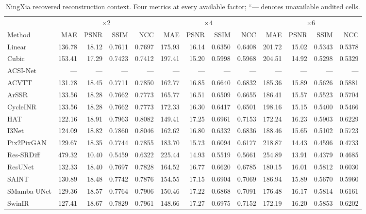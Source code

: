 \begin{table}[t]
\caption{NingXia recovered reconstruction context. Four metrics at every available factor; ``--- denotes unavailable audited cells.}
\label{tab:arch-benchmark-ningxia}\centering\scriptsize
\setlength{\tabcolsep}{3pt}
\begin{tabular}{lrrrrrrrrrrrr}
\toprule
&\multicolumn{4}{c}{$\times2$}&\multicolumn{4}{c}{$\times4$}&\multicolumn{4}{c}{$\times6$}\\
Method&MAE&PSNR&SSIM&NCC&MAE&PSNR&SSIM&NCC&MAE&PSNR&SSIM&NCC\\
\midrule
Linear & 136.78 & 18.12 & 0.7611 & 0.7697 & 175.93 & 16.14 & 0.6350 & 0.6408 & 201.72 & 15.02 & 0.5343 & 0.5378 \\
Cubic & 153.41 & 17.29 & 0.7423 & 0.7412 & 197.41 & 15.20 & 0.5998 & 0.5968 & 204.51 & 14.92 & 0.5298 & 0.5329 \\
ACSI-Net & --- & --- & --- & --- & --- & --- & --- & --- & --- & --- & --- & --- \\
ACVTT & 131.78 & 18.45 & 0.7711 & 0.7850 & 162.77 & 16.85 & 0.6640 & 0.6832 & 185.36 & 15.89 & 0.5626 & 0.5881 \\
ArSSR & 133.56 & 18.28 & 0.7662 & 0.7773 & 165.77 & 16.51 & 0.6509 & 0.6655 & 186.41 & 15.57 & 0.5523 & 0.5704 \\
CycleINR & 133.56 & 18.28 & 0.7662 & 0.7773 & 172.33 & 16.30 & 0.6417 & 0.6501 & 198.16 & 15.15 & 0.5400 & 0.5466 \\
HAT & 122.16 & 18.91 & 0.7963 & 0.8082 & 149.41 & 17.25 & 0.6961 & 0.7153 & 172.24 & 16.23 & 0.5903 & 0.6229 \\
I3Net & 124.09 & 18.82 & 0.7860 & 0.8046 & 162.62 & 16.80 & 0.6332 & 0.6836 & 188.46 & 15.65 & 0.5102 & 0.5723 \\
Pix2PixGAN & 129.67 & 18.35 & 0.7744 & 0.7855 & 183.70 & 15.73 & 0.6094 & 0.6177 & 218.87 & 14.43 & 0.4596 & 0.4733 \\
Res-SRDiff & 479.32 & 10.40 & 0.5459 & 0.6322 & 225.44 & 14.93 & 0.5519 & 0.5661 & 254.89 & 13.91 & 0.4379 & 0.4685 \\
ResUNet & 132.33 & 18.40 & 0.7697 & 0.7828 & 164.52 & 16.77 & 0.6620 & 0.6785 & 180.15 & 16.01 & 0.5812 & 0.6030 \\
SAINT & 130.89 & 18.48 & 0.7742 & 0.7876 & 154.55 & 17.15 & 0.6904 & 0.7069 & 186.94 & 15.89 & 0.5670 & 0.5960 \\
SMamba-UNet & 129.36 & 18.57 & 0.7764 & 0.7906 & 150.46 & 17.22 & 0.6868 & 0.7091 & 176.48 & 16.17 & 0.5814 & 0.6161 \\
SwinIR & 127.41 & 18.67 & 0.7829 & 0.7961 & 148.66 & 17.27 & 0.6975 & 0.7152 & 172.19 & 16.20 & 0.5853 & 0.6202 \\
\bottomrule
\end{tabular}
\end{table}

